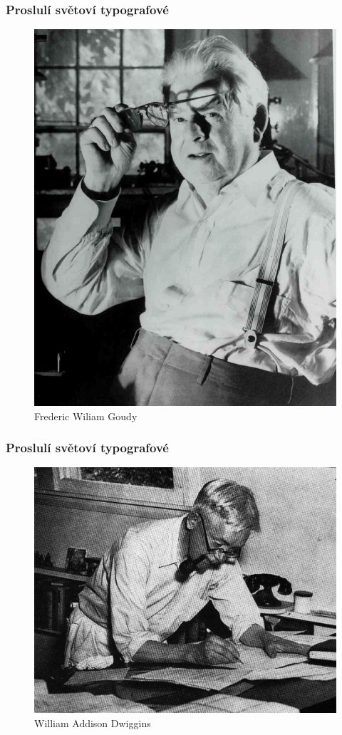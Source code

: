 \documentclass{beamer}
\begin{document}
\begin{frame}
\frametitle{Proslulí světoví typografové}
\begin{figure}[Htbp]
\includegraphics[scale = 0.18]{FredericGoudy.jpg}
\caption{Frederic Wiliam Goudy }
\end{figure}
\end{frame}
\begin{frame}
\frametitle{Proslulí světoví typografové}
\begin{figure}[Htbp]
\includegraphics[scale = 0.20]{William-Addison-Dwiggins.jpg}
\caption{William Addison Dwiggins}
\end{figure}
\end{frame}
\end{document}
